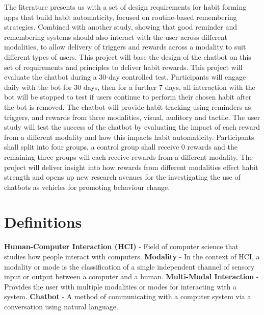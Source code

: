 \newline
The literature presents us with a set of design requirements for habit forming apps that build habit automaticity, focused on routine-based remembering strategies. Combined with another study, showing that good reminder and remembering systems should also interact with the user across different modalities, to allow delivery of triggers and rewards across a modality to suit different types of users. This project will base the design of the chatbot on this set of requirements and principles to deliver habit rewards.\newline
\newline
This project will evaluate the chatbot during a 30-day controlled test. Participants will engage daily with the bot for 30 days, then for a further 7 days, all interaction with the bot will be stopped to test if users continue to perform their chosen habit after the bot is removed. The chatbot will provide habit tracking using reminders as triggers, and rewards from three modalities, visual, auditory and tactile. The user study will test the success of the chatbot by evaluating the impact of each reward from a different modality and how this impacts habit automaticity. Participants shall split into four groups, a control group shall receive 0 rewards and the remaining three groups will each receive rewards from a different modality.\newline
\newline
The project will deliver insight into how rewards from different modalities effect habit strength and opens up new research avenues for the investigating the use of chatbots as vehicles for promoting behaviour change.

\newpage

\section*{Definitions}

\textbf{Human-Computer Interaction (HCI)} - Field of computer science that studies how people interact with computers.\newline
\newline
\textbf{Modality} - In the context of HCI, a modality or mode is the classification of a single independent channel of sensory input or output between a computer and a human.\newline
\newline
\textbf{Multi-Modal Interaction} - Provides the user with multiple modalities or modes for interacting with a system.\newline
\newline
\textbf{Chatbot} - A method of communicating with a computer system via a conversation using natural language.

\newpage
